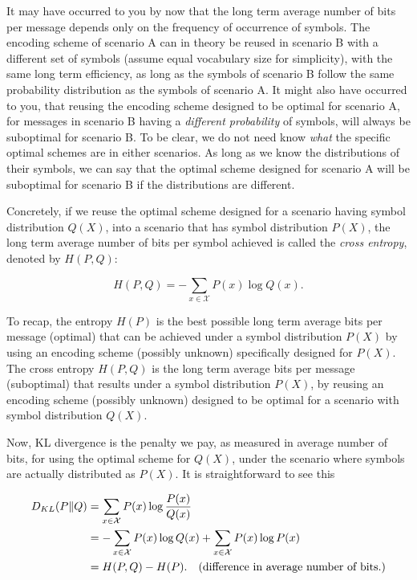 It may have occurred to you by now that the long term average number of bits per message depends only
on the frequency of occurrence of symbols. The encoding scheme of scenario A can in theory be
reused in scenario B with a different set of symbols (assume equal vocabulary size for simplicity),
with the same long term efficiency, as long as the symbols of scenario B follow the same probability
distribution as the symbols of scenario A. It might also have occurred to you, that reusing the encoding scheme
designed to be optimal for scenario A, for messages in scenario B having a \emph{different probability} of symbols, will always
be suboptimal for scenario B. To be clear, we do not need know \emph{what} the specific optimal
schemes are in either scenarios. As long as we know the distributions of their symbols,
we can say that the optimal scheme designed for scenario A will be suboptimal for scenario B if the
distributions are different.

Concretely, if we reuse the optimal scheme designed for a scenario having symbol distribution $Q(X)$,
into a scenario that has symbol distribution $P(X)$, the long term average
number of bits per symbol achieved is called the \emph{cross entropy}, denoted by $H(P, Q)$:

$$H(P, Q) = -\sum_{x \in \mathcal{X}} P(x) \log Q(x). $$

To recap, the entropy $H(P)$ is the best possible long term average bits per message (optimal) that
can be achieved under a symbol distribution $P(X)$ by using an encoding scheme (possibly unknown)
specifically designed for $P(X)$. The cross entropy $H(P, Q)$ is the long term average bits per
message (suboptimal) that results under a symbol distribution $P(X)$, by reusing an encoding
scheme (possibly unknown) designed to be optimal for a scenario with symbol distribution $Q(X)$.

Now, KL divergence is the penalty we pay, as measured in average number of bits, for using the
optimal scheme for $Q(X)$, under the scenario where symbols are actually distributed as $P(X)$. It is
straightforward to see this

\begin{align*}
D_{KL}(P \| Q) &= \sum_{x \in \mathcal{X}} P(x) \log\frac{P(x)}{Q(x)} \\
&=  - \sum_{x\in \mathcal{X}}P(x) \log Q(x) + \sum_{x \in \mathcal{X}} P(x) \log P(x) \\
&= H(P, Q) - H(P). \quad \text{(difference in average number of bits.)}
\end{align*}

